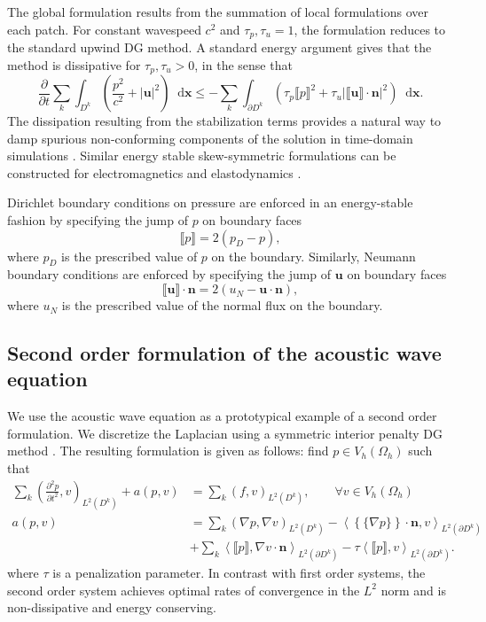 \documentclass[preprint,10pt]{elsarticle}
\newcommand{\pd}[2]{\frac{\partial#1}{\partial#2}}
\newcommand{\pdd}[2]{\frac{\partial^2#1}{\partial#2^2}}
\newcommand{\LRp}[1]{\left( #1 \right)}
\newcommand{\LRa}[1]{\left\langle #1 \right\rangle}
\newcommand{\LRb}[1]{\left| #1 \right|}
\newcommand{\LRc}[1]{\left\{ #1 \right\}}
\newcommand{\Grad} {\ensuremath{\nabla}}
\newcommand{\jump}[1] {\ensuremath{\llbracket#1\rrbracket}}
\newcommand{\avg}[1] {\ensuremath{\LRc{\!\{#1\}\!}}}
\newcommand{\reviewerTwo}[1]{#1}
\newcommand*\diff[1]{\mathop{}\!{\mathrm{d}#1}}
\begin{document}
The global formulation results from the summation of local formulations over each {\color{forestgreen}  patch}.  For constant wavespeed $c^2$  and $\tau_p, \tau_u = 1$, the formulation reduces to the standard upwind DG method.  A standard energy argument gives that the method is dissipative for $\tau_p, \tau_u > 0$, in the sense that 
\[
\pd{}{t}\sum_k \int_{D^k}\LRp{\frac{p^2}{c^2} + \LRb{\bm{u}}^2}\diff{{\bm{x}}} \leq -\sum_k \int_{\partial D^k} \LRp{\tau_p\jump{p}^2 + \tau_u\LRb{\jump{\bm{u}}\cdot \bm{n}}^2}\diff{{\bm{x}}}.
\]
The dissipation resulting from the stabilization terms provides a natural way to damp spurious non-conforming components of the solution in time-domain simulations \cite{chan2016short}.  Similar energy stable skew-symmetric formulations can be constructed for electromagnetics and elastodynamics \cite{warburton2013low, chan2017weight}.  

Dirichlet boundary conditions on pressure are enforced in an energy-stable fashion by specifying the jump of $p$ on boundary faces 
\[
\jump{p} = 2 (p_D - p),
\]
where $p_D$ is the prescribed value of $p$ on the boundary.  Similarly, Neumann boundary conditions are enforced by specifying the jump of $\bm{u}$ on boundary faces
\[
\jump{\bm{u}}\cdot \bm{n} = 2 (u_N - \bm{u}\cdot\bm{n}),
\]
where $u_N$ is the prescribed value of the normal flux on the boundary.

\subsection{Second order formulation of the acoustic wave equation}

We use the acoustic wave equation as a prototypical example of a second order formulation.  We discretize the Laplacian using a symmetric interior penalty DG method \cite{arnold1982interior, langer2015multipatch}.  The resulting formulation is given as follows: \reviewerTwo{find $p\in V_h(\Omega_h)$ such that}
\begin{align}
\sum_k\LRp{\pdd{p}{t},v}_{L^2\LRp{D^k}} + a(p,v) &= \sum_k\LRp{f,v}_{L^2\LRp{D^k}}, \qquad \reviewerTwo{\forall v \in V_h(\Omega_h)}\\
a(p,v) &= \sum_k\LRp{\Grad p,\Grad v}_{L^2\LRp{D^k}}  -\LRa{\avg{\Grad p}\cdot\bm{n}, v}_{L^2\LRp{\partial D^k}} \label{eq:varformwave2}\\
&+ \sum_k \LRa{\jump{p}, \Grad v\cdot\bm{n}}_{L^2\LRp{\partial D^k}} -\tau\LRa{\jump{p},v}_{L^2\LRp{\partial D^k}}\nonumber.
\end{align}
where $\tau$ is a penalization parameter.  In contrast with first order systems, the second order system achieves optimal rates of convergence in the $L^2$ norm and is non-dissipative and energy conserving.  %
\end{document}
